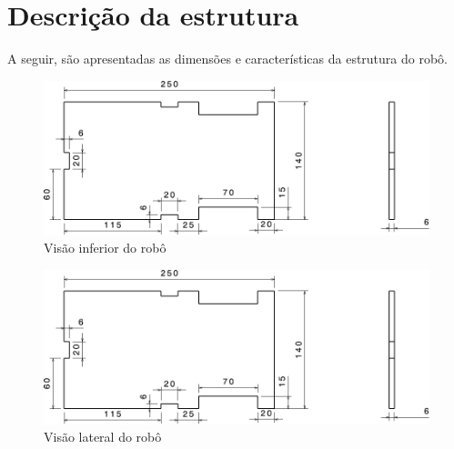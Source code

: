 \section{Descrição da estrutura}

A seguir, são apresentadas as dimensões e características da estrutura do robô.

\begin{figure}[htb]
  \caption{\label{fig:structure-down} Visão inferior do robô}

  \begin{center}
    \includegraphics[scale=0.525,page=1]{../img/structure.pdf}
  \end{center}

\end{figure}

\begin{figure}[htb]
  \caption{\label{fig:structure-side} Visão lateral do robô}

  \begin{center}
    \includegraphics[scale=0.525,page=2]{../img/structure.pdf}
  \end{center}

\end{figure}

